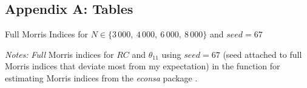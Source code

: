 


\subsection*{Appendix A: Tables} \label{appendix_a}

\begin{table}[H]
    \centering
    \caption{Full Morris Indices for $N \in \{3\,000,\ 4\,000,\ 6\,000,\ 8\,000\}$ and $seed=67$}
    \label{appendix_morris_seed_67}
    \begin{threeparttable}
    \begin{centering}
        
        \begin{tablenotes}
            \small
            \item \textit{Notes:} \textit{Full} Morris indices for $RC$ and $\theta_{11}$ using $seed=67$ (seed attached to full Morris indices that deviate most from my expectation) in the function for estimating Morris indices from the \textit{econsa} package \citep{OSE21}.
        \end{tablenotes}
    \end{centering}

    \end{threeparttable}

\end{table}